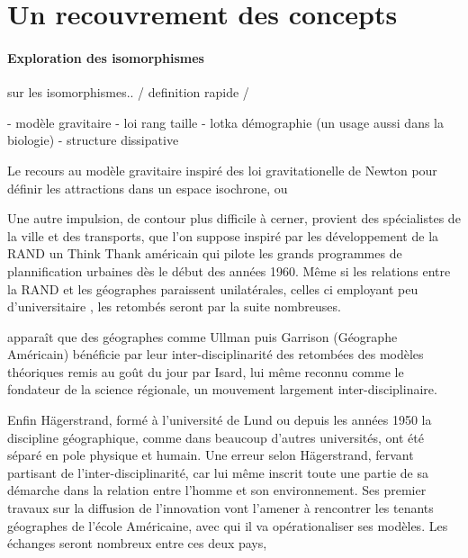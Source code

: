 {%




\section{Un recouvrement des concepts}
\label{ssubsec:recouvrement_concept}

\paragraph{Exploration des isomorphismes}

\autocite[699]{Pouvreau2013} sur les isomorphismes.. / definition rapide /

- modèle gravitaire 
- loi rang taille
- lotka démographie (un usage aussi dans la biologie)
- structure dissipative

Le recours au modèle gravitaire inspiré des loi gravitationelle de Newton pour définir les attractions dans un espace isochrone, ou  

Une autre impulsion, de contour plus difficile à cerner, provient des spécialistes de la ville et des transports, que l'on suppose inspiré par les développement de la RAND un Think Thank américain qui pilote les grands programmes de plannification urbaines dès le début des années 1960. Même si les relations entre la RAND et les géographes paraissent unilatérales, celles ci employant peu d'universitaire \autocite[9]{Batty1994}, les retombés seront par la suite nombreuses. 

 apparaît que des géographes comme Ullman puis Garrison (Géographe Américain) bénéficie par leur inter-disciplinarité des retombées des modèles théoriques remis au goût du jour par Isard, lui même reconnu comme le fondateur de la science régionale, un mouvement largement inter-disciplinaire.

Enfin Hägerstrand, formé à l'université de Lund ou depuis les années 1950 la discipline géographique, comme dans beaucoup d'autres universités, ont été séparé en pole physique et humain. Une erreur selon Hägerstrand, fervant partisant de l'inter-disciplinarité, car lui même inscrit toute une partie de sa démarche dans la relation entre l'homme et son environnement. Ses premier travaux sur la diffusion de l'innovation vont l'amener à rencontrer les tenants géographes de l'école Américaine, avec qui il va opérationaliser ses modèles. Les échanges seront nombreux entre ces deux pays,  \autocite{Chardonnel1999}

}
